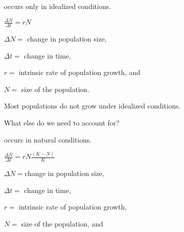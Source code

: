 \documentclass[t,handout]{beamer}  %
\begin{document}
\begin{frame}{ occurs only in idealized conditions.}
	\begin{center}
		\Huge $\frac{\Delta N}{\Delta t} = rN$
	\end{center}
	
	\hangpara $\Delta N = $ change in population size,

	\hangpara $\Delta t = $ change in time,
	
	\hangpara $r = $ intrinsic rate of population growth, and
	
	\hangpara $N = $ size of the population.
	
\end{frame}


{
\begin{frame}[b]
\end{frame}
}


{
\begin{frame}[b]


\end{frame}
}

\begin{frame}{}

	\hangpara\Large Most populations do not grow under idealized conditions.
	
	\hangpara\Large What else do we need to account for?
	
	\pause
	\hangpara {}
	
\end{frame}


\begin{frame}{ occurs in natural conditions.}
	\begin{center}
		\Huge $\frac{\Delta N}{\Delta t} = rN\frac{(K-N)}{K}$
	\end{center}
	
	\hangpara $\Delta N = $change in population size,

	\hangpara $\Delta t = $ change in time,
	
	\hangpara $r = $ intrinsic rate of population growth, 
	
	\hangpara $N = $ size of the population, and
	
	\hangpara {}
	
\end{frame}
\end{document}
